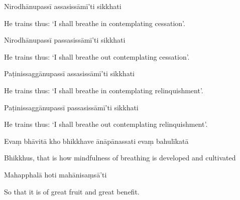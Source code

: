 Nirodhānupassī assasissāmī'ti sikkhati

\begin{english}
  He trains thus: `I shall breathe in contemplating cessation'.
\end{english}

Nirodhānupassī passasissāmī'ti sikkhati

\begin{english}
  He trains thus: `I shall breathe out contemplating cessation'.
\end{english}

Paṭinissaggānupassī assasissāmī'ti sikkhati

\begin{english}
  He trains thus: `I shall breathe in contemplating relinquishment'.
\end{english}

Paṭinissaggānupassī passasissāmī'ti sikkhati

\begin{english}
  He trains thus: `I shall breathe out contemplating relinquishment'.
\end{english}

Evaṃ bhāvitā kho bhikkhave ānāpānassati evaṃ bahulīkatā

\begin{english}
  Bhikkhus, that is how mindfulness of breathing is developed and cultivated
\end{english}

Mahapphalā hoti mahānisaṃsā'ti

\begin{english}
  So that it is of great fruit and great benefit.
\end{english}



